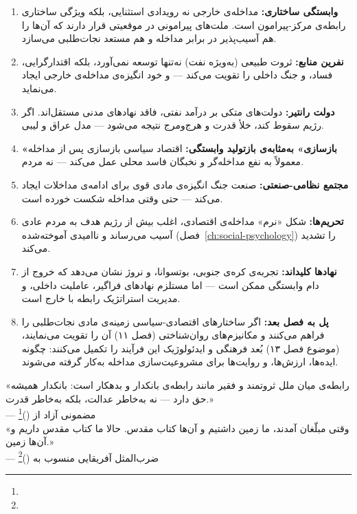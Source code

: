 \begin{tcolorbox}[wavebox, title={یافته‌های کلیدی فصل ۱۲}]
\begin{enumerate}
\item \textbf{وابستگی ساختاری:} مداخله‌ی خارجی نه رویدادی استثنایی، بلکه ویژگی ساختاری رابطه‌ی مرکز-پیرامون است. ملت‌های پیرامونی در موقعیتی قرار دارند که آن‌ها را هم آسیب‌پذیر در برابر مداخله و هم مستعد نجات‌طلبی می‌سازد.

\item \textbf{نفرین منابع:} ثروت طبیعی (به‌ویژه نفت) نه‌تنها توسعه نمی‌آورد، بلکه اقتدارگرایی، فساد، و جنگ داخلی را تقویت می‌کند — و خود انگیزه‌ی مداخله‌ی خارجی ایجاد می‌نماید.

\item \textbf{دولت رانتیر:} دولت‌های متکی بر درآمد نفتی، فاقد نهادهای مدنی مستقل‌اند. اگر رژیم سقوط کند، خلأ قدرت و هرج‌ومرج نتیجه می‌شود — مدل عراق و لیبی.

\item \textbf{«بازسازی» به‌مثابه‌ی بازتولید وابستگی:} اقتصاد سیاسی بازسازی پس از مداخله معمولاً به نفع مداخله‌گر و نخبگان فاسد محلی عمل می‌کند — نه مردم.

\item \textbf{مجتمع نظامی-صنعتی:} صنعت جنگ انگیزه‌ی مادی قوی برای ادامه‌ی مداخلات ایجاد می‌کند — حتی وقتی مداخله شکست خورده است.

\item \textbf{تحریم‌ها:} شکل «نرم» مداخله‌ی اقتصادی، اغلب بیش از رژیم هدف به مردم عادی آسیب می‌رساند و ناامیدی آموخته‌شده (فصل~\ref{ch:social-psychology}) را تشدید می‌کند.

\item \textbf{نهادها کلید‌اند:} تجربه‌ی کره‌ی جنوبی، بوتسوانا، و نروژ نشان می‌دهد که خروج از دام وابستگی ممکن است — اما مستلزم نهادهای فراگیر، عاملیت داخلی، و مدیریت استراتژیک رابطه با خارج است.

\item \textbf{پل به فصل بعد:} اگر ساختارهای اقتصادی-سیاسی زمینه‌ی مادی نجات‌طلبی را فراهم می‌کنند و مکانیزم‌های روان‌شناختی (فصل ۱۱) آن را تقویت می‌نمایند،  (موضوع فصل ۱۳) بُعد فرهنگی و ایدئولوژیک این فرآیند را تکمیل می‌کنند: چگونه ایده‌ها، ارزش‌ها، و روایت‌ها برای مشروعیت‌سازی مداخله به‌کار گرفته می‌شوند.
\end{enumerate}
\end{tcolorbox}

\begin{tcolorbox}[quotebox, title={سخن پایانی فصل}]
«رابطه‌ی میان ملل ثروتمند و فقیر مانند رابطه‌ی بانکدار و بدهکار است: بانکدار همیشه حق دارد — نه به‌خاطر عدالت، بلکه به‌خاطر قدرت.»\\
— مضمونی آزاد از  ()\footnote{}\\[6pt]
«وقتی مبلّغان آمدند، ما زمین داشتیم و آن‌ها کتاب مقدس. حالا ما کتاب مقدس داریم و آن‌ها زمین.»\\
— ضرب‌المثل آفریقایی منسوب به  ()\footnote{}
\end{tcolorbox}

\cleardoublepage